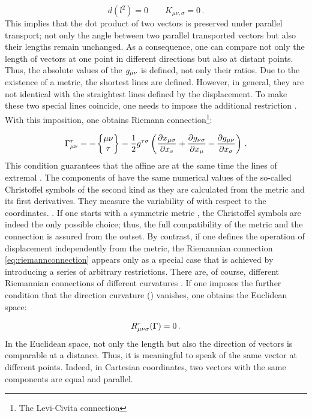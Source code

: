 \documentclass[submitted]{article}
\begin{document}
\begin{equation*}
d\left({l}^{2}\right)=0 \quad \quad K_{\mu \nu, \sigma}= 0\,.
\end{equation*}
% 
This implies that the dot product of two vectors is preserved under parallel transport; not only the angle between two parallel transported vectors but also their lengths remain unchanged. As a consequence, one can compare not only the length of vectors at one point in different directions but also at distant points. Thus, the absolute values of the $g_{\mu\nu}$ is defined, not only their ratios. Due to the existence of a metric, the shortest lines are defined. However, in general, they are not identical with the straightest lines defined by the displacement. To make these two special lines coincide, one needs to impose the additional restriction \sym. With this imposition, one obtains Riemann connection\footnote{The Levi-Civita connection}:

\begin{equation}\label{eq:riemannconnection}
\Gamma^\tau_{\mu\nu}=-\begin{Bmatrix} \mu \nu \\ \tau \end{Bmatrix} = \frac{1}{2} {g}^{\tau \sigma}\left(\frac{\partial {x}_{\mu \sigma}}{\partial {x}_{v}}+\frac{\partial {g}_{\nu \sigma}}{\partial {x}_{\mu}}-\frac{\partial {g}_{\mu \nu}}{\partial {x}_{\sigma}}\right)\,.
\end{equation}
%
This condition guarantees that the affine  are at the same time the lines of extremal . The components of \Gtmn have the same numerical values of the so-called Christoffel symbols of the second kind as they are calculated from the metric \gmn and its first derivatives. They measure the variability of \gmn with respect to the coordinates. . If one starts with a symmetric metric \gmn, the Christoffel symbols are indeed the only possible choice; thus, the full compatibility of the metric and the connection is assured from the outset. By contrast, if one defines the operation of displacement independently from the metric, the Riemannian connection \cref{eq:riemannconnection} appears only as a special case that is achieved by introducing a series of arbitrary restrictions. There are, of course, different Riemannian connections of different curvatures \ritea. If one imposes the further condition that the direction curvature () vanishes, one obtains the Euclidean space:

 \begin{equation*}
 R_{\mu \nu \sigma}^{\tau}(\Gamma)=0\,.
 \end{equation*}
%
In the Euclidean space, not only the length but also the direction of vectors is comparable at a distance. Thus, it is meaningful to speak of the same vector at different points. Indeed, in Cartesian coordinates, two vectors with the same components are equal and parallel.
\end{document}
